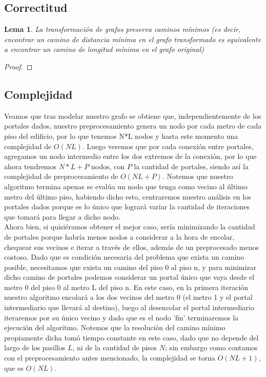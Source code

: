 \documentclass{article}
\newtheorem{lemma}{Lema}[theorem]
\theoremstyle{definition}
\theoremstyle{remark}
\begin{document}

\subsection{Correctitud}

\begin{lemma}
La transformación de grafos preserva caminos mínimos (es decir, encontrar un camino de distancia mínima en el grafo transformado es equivalente a encontrar un camino de longitud mínima en el grafo original)
\end{lemma}

\begin{proof}
\end{proof}

\subsection{Complejidad}
Veamos que tras modelar nuestro grafo se obtiene que, independientemente de los portales dados, nuestro preprocesamiento genera un nodo por cada metro de cada piso del edificio, por lo que tenemos N*L nodos y hasta este momento una complejidad de $O(NL)$. Luego veremos que por cada conexión entre portales, agregamos un nodo intermedio entre los dos extremos de la conexión, por lo que ahora tendremos $N*L+P$ nodos, con $P$ la cantidad de portales, siendo así la complejidad de preprocesamiento de $O(NL+P)$. Notemos que nuestro algoritmo termina apenas se evalúa un nodo que tenga como vecino al último metro del último piso, habiendo dicho esto, centraremos nuestro análisis en los portales dados porque es lo único que logrará variar la cantidad de iteraciones que tomará para llegar a dicho nodo. \\

Ahora bien, si quisiéramos obtener el mejor caso, sería minimizando la cantidad de portales porque habría menos nodos a considerar a la hora de encolar, chequear sus vecinos e iterar a través de ellos, además de un preprocesado menos costoso. Dado que es condición necesaria del problema que exista un camino posible, necesitamos que exista un camino del piso 0 al piso n, y para minimizar dicho camino de portales podemos considerar un portal único que vaya desde el metro 0 del piso 0 al metro L del piso n. En este caso, en la primera iteración nuestro algoritmo encolará a los dos vecinos del metro 0 (el metro 1 y el portal intermediario que llevará al destino), luego al desencolar el portal intermediario iteraremos por su único vecino y dado que es el nodo 'fin' terminaremos la ejecución del algoritmo. Notemos que la resolución del camino mínimo propiamente dicha tomó tiempo constante en este caso, dado que no depende del largo de los pasillos $L$, ni de la cantidad de pisos $N$; sin embargo como contamos con el preprocesamiento antes mencionado, la complejidad se torna $O(NL+1)$, que es $O(NL)$. \\
    
\end{document}
